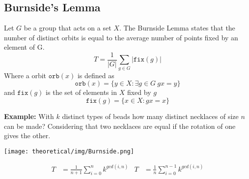 \subsection{Burnside's Lemma}

Let $G$ be a group that acts on a set $X$. The Burnside Lemma states that the number of distinct orbits is equal to the average number of points fixed by an element of G.
$$T = \frac{1}{|G|} \sum_{g \in G} |\texttt{fix}(g)|$$
Where a orbit $\texttt{orb}(x)$ is defined as
$$\texttt{orb}(x) = \{y \in X : \exists g \in G \ gx = y \}$$
and $\texttt{fix}(g)$ is the set of elements in $X$ fixed by $g$
$$\texttt{fix}(g) = \{x \in X : gx = x\}$$

\textbf{Example:} With $k$ distinct types of beads how many distinct necklaces of size $n$ can be made? Considering that two necklaces are equal if the rotation of one gives the other.

\begin{center}
\texttt{[image: theoretical/img/Burnside.png]}
\end{center}

\begin{align*}
T &= \frac{1}{n+1} \sum_{i=0}^{n}k^{gcd(i, n)} & T &= \frac{1}{n} \sum_{i=0}^{n-1}k^{gcd(i, n)}
\end{align*}
